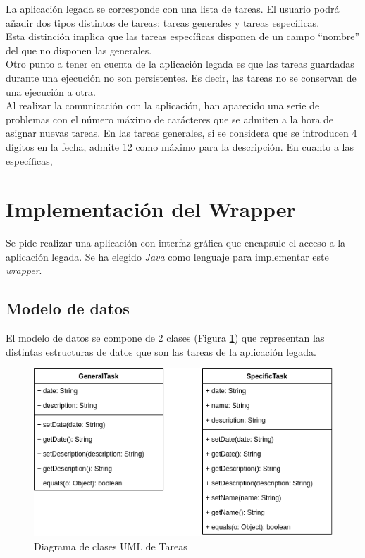 \documentclass[10pt,a4paper]{article}
\begin{document}
La aplicación legada se corresponde con una lista de tareas. El usuario podrá añadir dos tipos distintos de tareas: tareas generales y tareas específicas.\\
Esta distinción implica que las tareas específicas disponen de un campo ``nombre'' del que no disponen las generales.\\
Otro punto a tener en cuenta de la aplicación legada es que las tareas guardadas durante una ejecución no son persistentes. Es decir, las tareas no se conservan de una ejecución a otra.\\
Al realizar la comunicación con la aplicación, han aparecido una serie de problemas con el número máximo de carácteres que se admiten a la hora de asignar nuevas tareas. En las tareas generales, si se considera que se introducen 4 dígitos en la fecha, admite 12 como máximo para la descripción. En cuanto a las específicas, 
\newpage
\section{Implementación del Wrapper}

Se pide realizar una aplicación con interfaz gráfica que encapsule el acceso a la aplicación legada. Se ha elegido \emph{Java} como lenguaje para implementar este \emph{wrapper}.

\subsection{Modelo de datos}

El modelo de datos se compone de 2 clases (Figura \ref{fig:tasks_class_diagram}) que representan las distintas estructuras de datos que son las tareas de la aplicación legada.

\begin{figure}[h!]
\centering
\includegraphics[scale=0.5]{images/class_diagram.png}
\caption{Diagrama de clases UML de Tareas}
\label{fig:tasks_class_diagram}
\end{figure}
\end{document}
